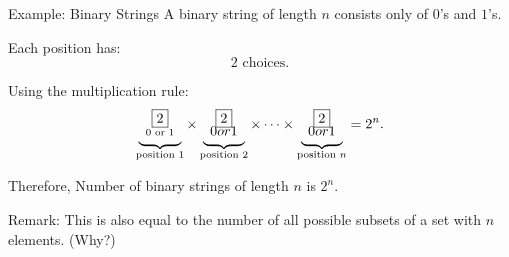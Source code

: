 \begin{frame}{Example: Binary Strings}
A binary string of length $n$ consists only of $0$'s and $1$'s.

\vspace{0.25cm}

Each position has:
\[
2 \text{ choices}.
\]

Using the multiplication rule:
\[
\underbrace{
\begin{array}{c}
\fbox{$2$}\\[-1mm]
{\text{\scriptsize 0 or 1}}
\end{array}
}_{\text{position }1}
\times
\underbrace{
\begin{array}{c}
\fbox{$2$}\\[-1mm]
{\scriptsize 0 or 1}
\end{array}
}_{\text{position }2}
\times
\cdots
\times
\underbrace{
\begin{array}{c}
\fbox{$2$}\\[-1mm]
{\scriptsize 0 or 1}
\end{array}
}_{\text{position }n}
=
2^n.
\]

Therefore, Number of binary strings of length $n$ is  $2^n$.

Remark: This is also equal to the number of all possible subsets of a set with $n$ elements. (Why?)
\end{frame}






